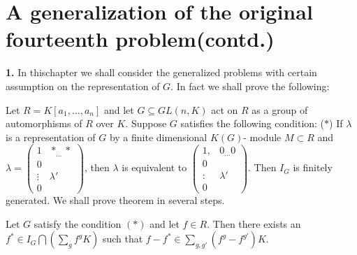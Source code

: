 

\chapter{A generalization of the original  fourteenth
  problem(contd.)}\label{chap2} %

{\bf 1.} In this\pageoriginale chapter we shall consider the  generalized problems
  with certain assumption on the representation of $G$. In fact we
  shall prove the following: 

\setcounter{thm}{0}
\begin{thm}\label{chap2:thm1}%
 Let $R=K [a_1, \ldots , a_n]$ and let $G \subseteq GL(n,K)$ act on
 $R$ as a group of automorphisms of $R$ over $K$. Suppose $G$
 satisfies the following condition: ($\ast$) If $\lambda$ is a
 representation  of $G$ by a finite dimensional $K(G)$- module $M
 \subset R$ and  $\lambda =\left(\begin{smallmatrix} 1 & \ast_ {\ldots} \ast
 \\ 0 &  \\ \vdots &  \lambda' \\ 0 & \end{smallmatrix}\right)$, then  $\lambda$
 is  equivalent  to  $\left(\begin{smallmatrix} 1, & 0_ {\ldots} 0 \\ 0 &  \\ :
   & \lambda' \\ 0 & \end{smallmatrix}\right)$. Then $I_G$ is finitely generated.  
We shall prove theorem in several steps.
\end{thm}

\setcounter{lem}{0}
\begin{lem}\label{chap2:lem1}%
 Let $G$ satisfy the condition $(\ast)$ and let  $f \in R$. Then there
 exists  an $f^\ast \in I_G \bigcap (\sum\limits_{g} f^g K)$ such that
 $ f-f^* \in  \sum\limits_{g,g'} (f^g - f^{g'}) K$. 
 \end{lem}
 
